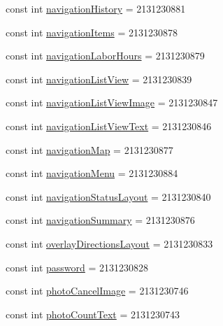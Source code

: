 \begin{DoxyCompactItemize}
\item 
const int \hyperlink{class_field_service_1_1_android_1_1_resource_1_1_id_a8e62c3253a7443fcf0e671d5d5943a36}{navigation\+History} = 2131230881
\item 
const int \hyperlink{class_field_service_1_1_android_1_1_resource_1_1_id_a05b9e2fd2f41eb72834a1fdaddee3c2c}{navigation\+Items} = 2131230878
\item 
const int \hyperlink{class_field_service_1_1_android_1_1_resource_1_1_id_a8e99591b6d5c25d84e09832aaf3c9460}{navigation\+Labor\+Hours} = 2131230879
\item 
const int \hyperlink{class_field_service_1_1_android_1_1_resource_1_1_id_a9dd181704a6de0487bbeefcc2e67df58}{navigation\+List\+View} = 2131230839
\item 
const int \hyperlink{class_field_service_1_1_android_1_1_resource_1_1_id_a89c9613974af502b1b4af6839d32dd83}{navigation\+List\+View\+Image} = 2131230847
\item 
const int \hyperlink{class_field_service_1_1_android_1_1_resource_1_1_id_a63e749f0a35eb4e812c800891e1061e5}{navigation\+List\+View\+Text} = 2131230846
\item 
const int \hyperlink{class_field_service_1_1_android_1_1_resource_1_1_id_ac7215ccfb1b5e854a2336a09ea5f4dda}{navigation\+Map} = 2131230877
\item 
const int \hyperlink{class_field_service_1_1_android_1_1_resource_1_1_id_a4ff66c6435f9dc6056049bfd48ed880b}{navigation\+Menu} = 2131230884
\item 
const int \hyperlink{class_field_service_1_1_android_1_1_resource_1_1_id_a79b3df04198ad0d6cbc8af5809e5d252}{navigation\+Status\+Layout} = 2131230840
\item 
const int \hyperlink{class_field_service_1_1_android_1_1_resource_1_1_id_a73b5d2d5400bb3af65ecb8fd94103d37}{navigation\+Summary} = 2131230876
\item 
const int \hyperlink{class_field_service_1_1_android_1_1_resource_1_1_id_afec5df2cb668e3f9cfdb5244ba262144}{overlay\+Directions\+Layout} = 2131230833
\item 
const int \hyperlink{class_field_service_1_1_android_1_1_resource_1_1_id_a80769bd63682788db241ef64a1dbcdea}{password} = 2131230828
\item 
const int \hyperlink{class_field_service_1_1_android_1_1_resource_1_1_id_a39d945457b0a8e5785d0da87a13afeda}{photo\+Cancel\+Image} = 2131230746
\item 
const int \hyperlink{class_field_service_1_1_android_1_1_resource_1_1_id_a4e4079b1b75b017a2f56c8e640481fd3}{photo\+Count\+Text} = 2131230743

\end{DoxyCompactItemize}

